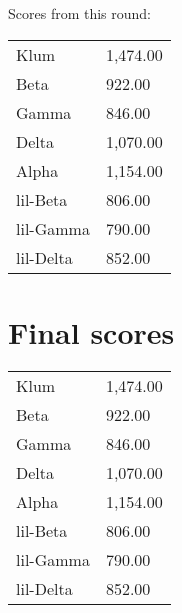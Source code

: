 \documentclass{article}
\begin{document}
Scores from this round:
\begin{tabular}[t]{ll}
Klum & 1,474.00\\
Beta & 922.00\\
Gamma & 846.00\\
Delta & 1,070.00\\
Alpha & 1,154.00\\
lil-Beta & 806.00\\
lil-Gamma & 790.00\\
lil-Delta & 852.00\\
\end{tabular}
\section*{Final scores}

\begin{center}
\begin{tabular}[t]{ll}
Klum & 1,474.00\\
Beta & 922.00\\
Gamma & 846.00\\
Delta & 1,070.00\\
Alpha & 1,154.00\\
lil-Beta & 806.00\\
lil-Gamma & 790.00\\
lil-Delta & 852.00\\
\end{tabular}
\end{center}
\end{document}
